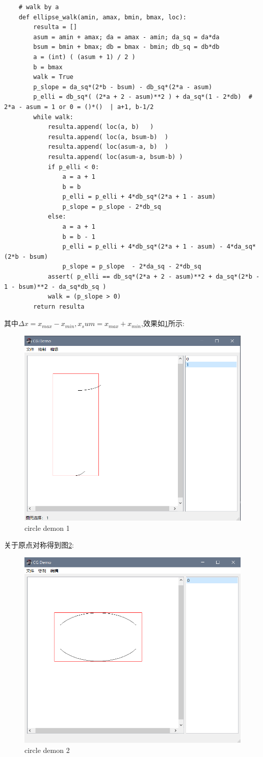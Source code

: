 \documentclass[a4paper,UTF8]{article}
\theoremstyle{definition}
\begin{document}
\begin{lstlisting}
    # walk by a
    def ellipse_walk(amin, amax, bmin, bmax, loc):
        resulta = []
        asum = amin + amax; da = amax - amin; da_sq = da*da
        bsum = bmin + bmax; db = bmax - bmin; db_sq = db*db
        a = (int) ( (asum + 1) / 2 )
        b = bmax
        walk = True
        p_slope = da_sq*(2*b - bsum) - db_sq*(2*a - asum)
        p_elli = db_sq*( (2*a + 2 - asum)**2 ) + da_sq*(1 - 2*db)  # 2*a - asum = 1 or 0 = ()*()  | a+1, b-1/2
        while walk:
            resulta.append( loc(a, b)   )
            resulta.append( loc(a, bsum-b)  )
            resulta.append( loc(asum-a, b)  )
            resulta.append( loc(asum-a, bsum-b) )
            if p_elli < 0:
                a = a + 1
                b = b
                p_elli = p_elli + 4*db_sq*(2*a + 1 - asum)
                p_slope = p_slope - 2*db_sq
            else:
                a = a + 1
                b = b - 1
                p_elli = p_elli + 4*db_sq*(2*a + 1 - asum) - 4*da_sq*(2*b - bsum)
                p_slope = p_slope  - 2*da_sq - 2*db_sq
            assert( p_elli == db_sq*(2*a + 2 - asum)**2 + da_sq*(2*b - 1 - bsum)**2 - da_sq*db_sq )
            walk = (p_slope > 0)
        return resulta
\end{lstlisting}
其中$\Delta x = x_{max} - x_{min}, x_sum = x_{max} + x_{min}$,效果如\ref{fig4}所示:
\begin{figure}[h]
    \centering
    \includegraphics[width = .5\textwidth]{source/pics/circle_demon1.PNG}
    \caption{circle demon 1}
    \label{fig4}
\end{figure}

关于原点对称得到图\ref{fig5}:
\begin{figure}[h]
    \centering
    \includegraphics[width = .5\textwidth]{source/pics/circle_demon2.PNG}
    \caption{circle demon 2}
    \label{fig5}
\end{figure}
\end{document}

